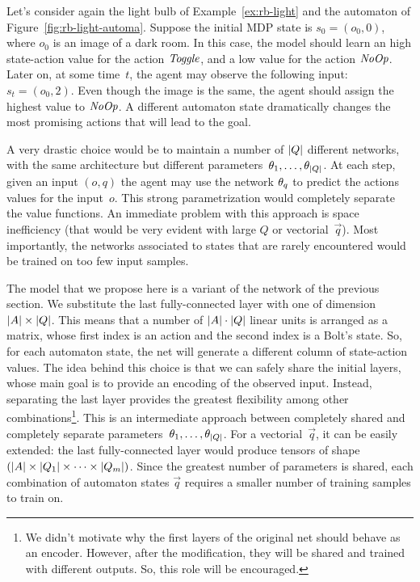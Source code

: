 \begin{example}
	Let's consider again the light bulb of Example~\ref{ex:rb-light} and
	the automaton of Figure~\ref{fig:rb-light-automa}. Suppose the initial MDP
	state is $s_0 = (o_0, 0)$, where $o_0$ is an image of a dark room. In this
	case, the model should learn an high state-action value for the action
	$\text{\textit{Toggle}}$, and a low value for the action $\text{\textit{NoOp}}$. Later on,
	at some time~$t$, the agent may observe the following input: $s_t = (o_0,
	2)$. Even though the image is the same, the agent should assign the highest
	value to $\text{\textit{NoOp}}$. A different automaton state dramatically changes
	the most promising actions that will lead to the goal.
\end{example}

A very drastic choice would be to maintain a number of $\lvert Q\rvert$ different
networks, with the same architecture but different parameters~$\theta_1,
\dots, \theta_{\lvert Q\rvert}$. At each step, given an input $(o, q)$ the agent may
use the network $\theta_q$ to predict the actions values for the input~$o$.
This strong parametrization would completely separate the value functions.
An immediate problem with this approach is space inefficiency (that would be
very evident with large $Q$ or vectorial~$\vec{q}$). Most importantly, the
networks associated to states that are rarely encountered would be trained
on too few input samples.

The model that we propose here is a variant of the network of the previous
section. We substitute the last fully-connected layer with one of dimension
$\lvert A\rvert \times \lvert Q\rvert$. This means that a number of $\lvert A\rvert \cdot \lvert Q\rvert$
linear units is arranged as a matrix, whose first index is an action and
the second index is a Bolt's state. So, for each automaton state, the net will
generate a different column of state-action values. The idea behind this
choice is that we can safely share the initial layers, whose main goal is to
provide an encoding of the observed input. Instead, separating the last layer
provides the greatest flexibility among other combinations\footnote{
	We didn't motivate why the first layers of the original net should behave as
	an encoder. However, after the modification, they will be shared and trained
	with different outputs. So, this role will be encouraged.
}. This is an intermediate approach between completely shared and completely
separate parameters~$\theta_1, \dots, \theta_{\lvert Q\rvert}$. For a
vectorial~$\vec{q}$, it can be easily extended: the last fully-connected layer
would produce tensors of shape $(\lvert A\rvert \times \lvert Q_1\rvert \times \dots \times
\lvert Q_m\rvert)$. Since the greatest number of parameters is shared, each
combination of automaton states $\vec{q}$ requires a smaller number of
training samples to train on.

